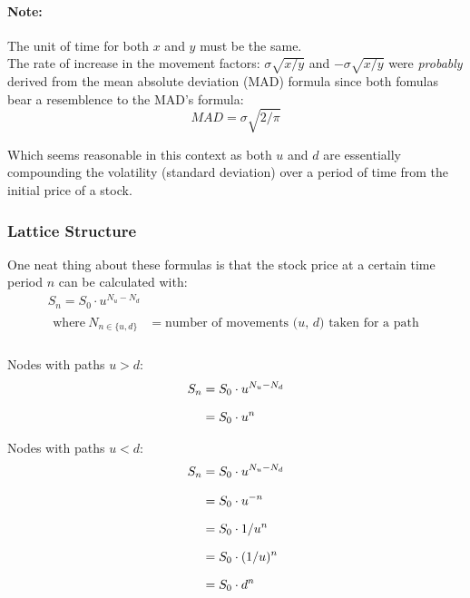 \documentclass[12pt, letterpaper]{article}\usepackage{float}
\begin{document}
\paragraph{Note:} The unit of time for both ${x}$ and ${y}$ must be the same. \\

\bigskip
The rate of increase in the movement factors: ${\sigma\sqrt{x/y}}$ and ${-\sigma\sqrt{x/y}}$ were \textit{probably} derived from the mean absolute deviation (MAD) formula since both fomulas bear a resemblence to the MAD's formula\cite{madwikipedia}:
\begin{equation*}
  MAD = \sigma\sqrt{2/\pi}
\end{equation*}

\noindent Which seems reasonable in this context as both ${u}$ and ${d}$ are essentially compounding the volatility (standard deviation) over a period of time from the initial price of a stock.

\bigskip

\subsubsection*{Lattice Structure}

One neat thing about these formulas is that the stock price at a certain time period ${n}$ can be calculated with:
\begin{gather*}
  S_n = S_0 \cdot u^{N_u-N_d} \\
  \begin{align*}
    \text{where}~N_{n \in \{u,d\}} &= \text{number of movements (${u}$, ${d}$) taken for a path}
  \end{align*} \\
\end{gather*}

\medskip

Nodes with paths ${u > d}$:
\begin{equation*}
  \setlength{\jot}{10pt}
  \begin{split}
    {S}_n
    & = {S}_0 \cdot {u}^{N_u-N_d} \\
    & = {S}_0 \cdot {u}^n
  \end{split}
\end{equation*}

\pagebreak

Nodes with paths ${u < d}$:
\begin{equation*}
  \setlength{\jot}{10pt}
  \begin{split}
    {S}_n
    & = {S}_0 \cdot {u}^{N_u-N_d} \\
    & = {S}_0 \cdot {u^{-n}} \\
    & = {S}_0 \cdot {1/u^n} \\
    & = {S}_0 \cdot ({1/u})^n \\
    & = {S}_0 \cdot {d^n}
  \end{split}
\end{equation*}
\end{document}
